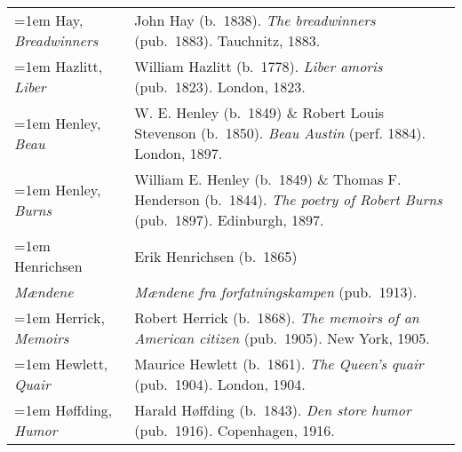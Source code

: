 \begin{xltabular}{\textwidth}{ lQ }
\hangindent=1em  Hay, \textit{Breadwinners} & John Hay (b.~1838). \textit{The breadwinners} (pub.~1883). Tauchnitz, 1883. \\ %

\hangindent=1em  Hazlitt, \textit{Liber} & William Hazlitt (b.~1778). \textit{Liber amoris} (pub.~1823). London, 1823. \\

\hangindent=1em  Henley, \textit{Beau} & W. E. Henley (b.~1849) \& Robert Louis Stevenson (b.~1850). \textit{Beau Austin} (perf. 1884). London, 1897. \\

\hangindent=1em  Henley, \textit{Burns} & William E. Henley (b.~1849) \& Thomas F. Henderson (b.~1844). \textit{The poetry of Robert Burns} (pub.~1897). Edinburgh, 1897. \\

\hangindent=1em  Henrichsen & Erik Henrichsen (b.~1865)\\
\hspace{1em}\textit{Mændene} & \textit{Mændene fra forfatningskampen} (pub.~1913). \\

\hangindent=1em  Herrick, \textit{Memoirs} & Robert Herrick (b.~1868). \textit{The memoirs of an American citizen} (pub.~1905). New York, 1905. \\

\hangindent=1em  Hewlett, \textit{Quair} & Maurice Hewlett (b.~1861). \textit{The Queen's quair} (pub.~1904). London, 1904. \\

\hangindent=1em  Høffding, \textit{Humor} & Harald Høffding (b.~1843). \textit{Den store humor} (pub.~1916). Copenhagen, 1916. \\


\end{xltabular}
